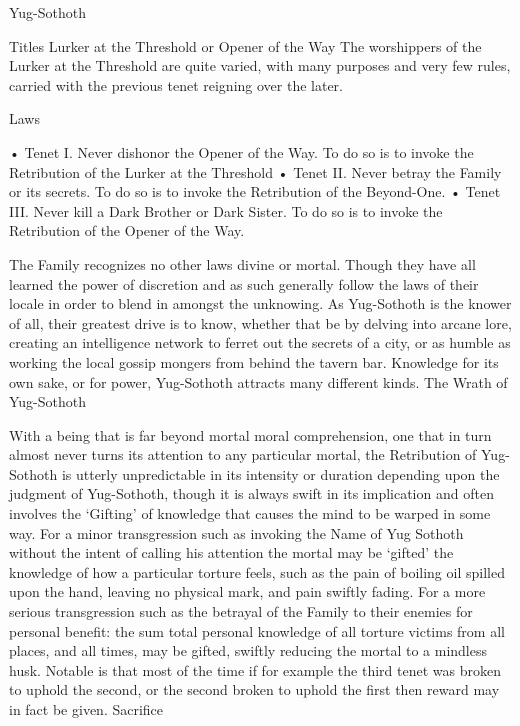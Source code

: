 \documentclass[blue]{guildcamp4}
\begin{document}
\name{\bYog{}}

Yug-Sothoth

Titles Lurker at the Threshold or Opener of the Way
The worshippers of the Lurker at the Threshold are quite varied, with many purposes and very few rules, carried with the previous tenet reigning over the later.

Laws

•	Tenet I. Never dishonor the Opener of the Way. To do so is to invoke the Retribution of the Lurker at the Threshold   
•	Tenet II. Never betray the Family or its secrets. To do so is to invoke the Retribution of the Beyond-One. 
•	Tenet III. Never kill a Dark Brother or Dark Sister. To do so is to invoke the Retribution of the Opener of the Way. 

The Family recognizes no other laws divine or mortal. Though they have all learned the power of discretion and as such generally follow the laws of their locale in order to blend in amongst the unknowing. As Yug-Sothoth is the knower of all, their greatest drive is to know, whether that be by delving into arcane lore, creating an intelligence network to ferret out the secrets of a city, or as humble as working the local gossip mongers from behind the tavern bar. Knowledge for its own sake, or for power, Yug-Sothoth attracts many different kinds.
The Wrath of Yug-Sothoth

With a being that is far beyond mortal moral comprehension, one that in turn almost never turns its attention to any particular mortal, the Retribution of Yug-Sothoth is utterly unpredictable in its intensity or duration depending upon the judgment of Yug-Sothoth, though it is always swift in its implication and often involves the ‘Gifting’ of knowledge that causes the mind to be warped in some way. For a minor transgression such as invoking the Name of Yug Sothoth without the intent of calling his attention the mortal may be ‘gifted’ the knowledge of how a particular torture feels, such as the pain of boiling oil spilled upon the hand, leaving no physical mark, and pain swiftly fading. For a more serious transgression such as the betrayal of the Family to their enemies for personal benefit: the sum total personal knowledge of all torture victims from all places, and all times, may be gifted, swiftly reducing the mortal to a mindless husk. Notable is that most of the time if for example the third tenet was broken to uphold the second, or the second broken to uphold the first then reward may in fact be given.
Sacrifice
\end{document}

